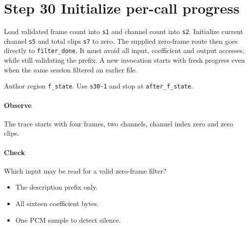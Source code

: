 \section{Step 30 Initialize per-call progress}\label{pcm-wav-s30}
Load validated frame count into \texttt{s1} and channel count into \texttt{s2}. Initialize current channel \texttt{s5} and total clips \texttt{s7} to zero. The supplied zero-frame route then goes directly to \texttt{filter\_done}. It must avoid all input, coefficient and output accesses, while still validating the prefix. A new invocation starts with fresh progress even when the same session filtered an earlier file.

Author region \texttt{f\_state}. Use \texttt{s30-1} and stop at \texttt{after\_f\_state}.

\paragraph{Observe} The trace starts with four frames, two channels, channel index zero and zero clips.

\paragraph{Check} Which input may be read for a valid zero-frame filter?
\begin{itemize}
\item[A.] The description prefix only.
\item[B.] All sixteen coefficient bytes.
\item[C.] One PCM sample to detect silence.
\end{itemize}
